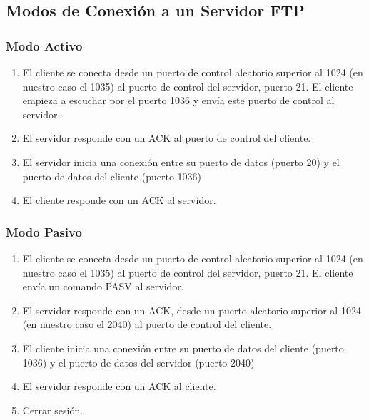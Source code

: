 \subsection*{Modos de Conexión a un Servidor FTP}
\noindent
\begin{minipage}[t]{.5\textwidth}
\raggedright
\subsubsection*{Modo Activo}
\begin{enumerate}
\item El cliente se conecta desde un puerto de control aleatorio superior al 1024 (en nuestro caso el 1035) al puerto de control del servidor, puerto 21. El cliente empieza a escuchar por el puerto 1036 y envía este puerto de control al servidor.

\item El servidor responde con un ACK al puerto de control del cliente.

\item El servidor inicia una conexión entre su puerto de datos (puerto 20) y el puerto de datos del cliente (puerto 1036)

\item El cliente responde con un ACK al servidor.
\end{enumerate}    
\end{minipage}%
\begin{minipage}[t]{.5\textwidth}
\raggedright
\subsubsection*{Modo Pasivo}
\begin{enumerate}
\item El cliente se conecta desde un puerto de control aleatorio superior al 1024 (en nuestro caso el 1035) al puerto de control del servidor, puerto 21. El cliente envía un comando PASV al servidor.

\item El servidor responde con un ACK, desde un puerto aleatorio superior al 1024 (en nuestro caso el 2040) al puerto de control del cliente.

\item El cliente inicia una conexión entre su puerto de datos del cliente (puerto 1036) y el puerto de datos del servidor (puerto 2040)

\item El servidor responde con un ACK al cliente.
\item Cerrar sesión.
\end{enumerate}
\end{minipage}


